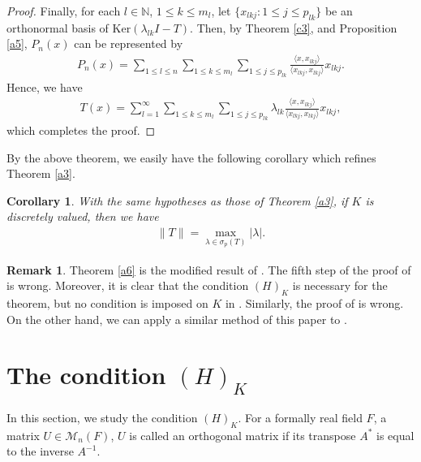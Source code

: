 \documentclass[12pt]{amsart}
\theoremstyle{plain}
\newtheorem{cor}[prop]{Corollary}
\theoremstyle{definition}
\newtheorem{rem}[prop]{Remark}
\begin{document}
\begin{proof}
  Finally, for each $l \in \mathbb{N}$, $1 \le k \le m_l$, let $\{ x_{lkj} : 1 \le j \le p_{lk} \}$ be an orthonormal basis of $\text{Ker} (\lambda_{lk} I - T)$. Then, by Theorem \ref{c3}, and Proposition \ref{a5}, $P_n(x)$ can be represented by
 \begin{align*} 
   P_n(x) = \sum_{1 \le l \le n} \sum_{1 \le k \le m_l} \sum_{1 \le j \le p_{lk}} \frac{\langle x, x_{lkj} \rangle}{\langle x_{lkj}, x_{lkj} \rangle} x_{lkj}.
  \end{align*} 
  Hence, we have
  \begin{align*}
    T(x) = \sum_{l=1}^{\infty} \sum_{1 \le k \le m_l} \sum_{1 \le j \le p_{lk}} \lambda_{lk} \frac{\langle x, x_{lkj} \rangle}{\langle x_{lkj}, x_{lkj} \rangle} x_{lkj},
  \end{align*}
  which completes the proof.
\end{proof}

By the above theorem, we easily have the following corollary which refines Theorem \ref{a3}.

\begin{cor} \label{a7}
  With the same hypotheses as those of Theorem \ref{a3}, if $K$ is discretely valued, then we have 
  \begin{align*}
    \|T\| = \max_{\lambda \in \sigma_p(T)} |\lambda|.
  \end{align*}
\end{cor}

\begin{rem}
  Theorem \ref{a6} is the modified result of \cite[Theorem 4.3]{sp}. The fifth step of the proof of \cite[Theorem 4.3]{sp} is wrong. Moreover, it is clear that the condition $(H)_K$ is necessary for the theorem, but no condition is imposed on $K$ in \cite[Theorem 4.3]{sp}. Similarly, the proof of \cite[Theorem 10]{lev} is wrong. On the other hand, we can apply a similar method of this paper to \cite[Theorem 10]{lev}.
\end{rem}

\section{The condition $(H)_K$} \label{b}

In this section, we study the condition $(H)_K$. For a formally real field $F$, a matrix $U \in \mathcal{M}_n(F)$, $U$ is called an orthogonal matrix if its transpose $A^*$ is equal to the inverse $A^{-1}$.
\end{document}
